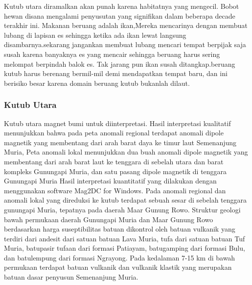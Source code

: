 		Kutub utara diramalkan akan punah karena habitatnya yang mengecil. Bobot hewan disana mengalami penyusutan yang signiﬁkan dalam beberapa decade terakhir ini. Makanan beruang adalah ikan,Mereka mencarinya dengan membuat lubang di lapisan es sehingga ketika ada ikan lewat langsung disambarnya.sekarang 
	jangankan membuat lubang mencari tempat berpijak saja susah karena banyaknya es yang mencair sehingga beruang harus sering melompat berpindah balok es.
	Tak jarang pun ikan susah ditangkap.beruang kutub harus berenang bermil-mil demi mendapatkan tempat baru, dan ini berisiko besar karena domain beruang
	kutub bukanlah dilaut.
	
	
\subsubsection{Kutub Utara}
		Kutub utara magnet bumi untuk diinterpretasi. Hasil interpretasi kualitatif menunjukkan bahwa pada peta anomali regional terdapat anomali dipole magnetik
	yang membentang dari arah barat daya ke timur laut Semenanjung Muria, Peta anomali lokal menunjukkan dua buah anomali dipole magnetik yang membentang dari 
	arah barat laut ke tenggara di sebelah utara dan barat kompleks Gunungapi Muria, dan satu pasang dipole magnetik di tenggara Gunungapi Muria Hasil 
	interpretasi kuantitatif yang dilakukan dengan menggunakan software Mag2DC for Windows. Pada anomali regional dan anomali lokal yang direduksi ke kutub 
	terdapat sebuah sesar di sebelah tenggara gunungapi Muria, tepatnya pada daerah Maar Gunung Rowo. Struktur geologi bawah permukaan daerah Gunungapi Muria 
	dan Maar Gunung Rowo berdasarkan harga suseptibilitas batuan dikontrol oleh batuan vulkanik yang terdiri dari andesit dari satuan batuan Lava Muria, tufa 
	dari satuan batuan Tuf Muria, batupasir tufaan dari formasi Patiayam, batugamping dari formasi Bulu, dan batulempung dari formasi Ngrayong. Pada kedalaman
	7-15 km di bawah permukaan terdapat batuan vulkanik dan vulkanik klastik yang merupakan batuan dasar penyusun Semenanjung Muria.
	
